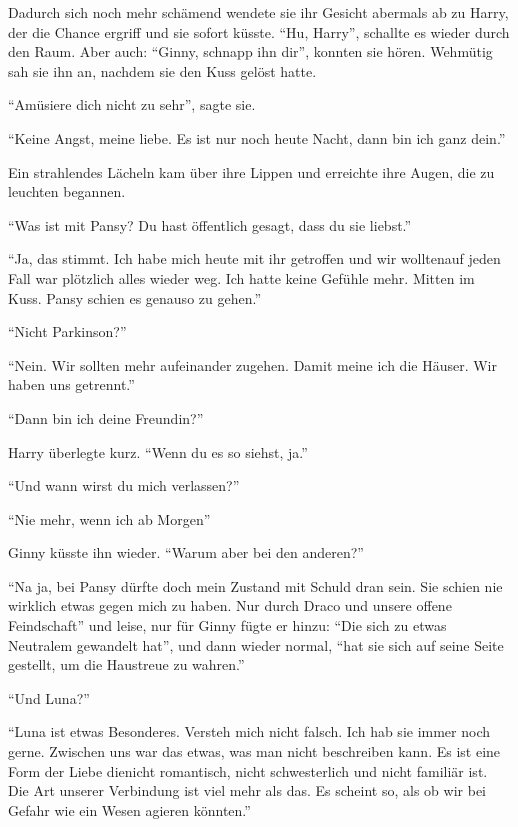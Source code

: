 Dadurch sich noch mehr schämend wendete sie ihr Gesicht abermals ab zu Harry, der die Chance ergriff und sie sofort küsste. \enquote{Hu, Harry}, schallte es wieder durch den Raum. Aber auch: \enquote{Ginny, schnapp ihn dir}, konnten sie hören. Wehmütig sah sie ihn an, nachdem sie den Kuss gelöst hatte.

\enquote{Amüsiere dich nicht zu sehr}, sagte sie.

\enquote{Keine Angst, meine liebe. Es ist nur noch heute Nacht, dann bin ich ganz dein.}

Ein strahlendes Lächeln kam über ihre Lippen und erreichte ihre Augen, die zu leuchten begannen.

\enquote{Was ist mit Pansy? Du hast öffentlich gesagt, dass du sie liebst.}

\enquote{Ja, das stimmt. Ich habe mich heute mit ihr getroffen und wir wollten\abs auf jeden Fall war plötzlich alles wieder weg. Ich hatte keine Gefühle mehr. Mitten im Kuss. Pansy schien es genauso zu gehen.}

\enquote{Nicht Parkinson?}

\enquote{Nein. Wir sollten mehr aufeinander zugehen. Damit meine ich die Häuser. Wir haben uns getrennt.}

\enquote{Dann bin ich deine Freundin?}

Harry überlegte kurz. \enquote{Wenn du es so siehst, ja.}

\enquote{Und wann wirst du mich verlassen?}

\enquote{Nie mehr, wenn ich ab Morgen\abs}

Ginny küsste ihn wieder. \enquote{Warum aber bei den anderen?}

\enquote{Na ja, bei Pansy dürfte doch mein Zustand mit Schuld dran sein. Sie schien nie wirklich etwas gegen mich zu haben. Nur durch Draco und unsere offene Feindschaft\abs} und leise, nur für Ginny fügte er hinzu: \enquote{Die sich zu etwas Neutralem gewandelt hat}, und dann wieder normal, \enquote{hat sie sich auf seine Seite gestellt, um die Haustreue zu wahren.}

\enquote{Und Luna?}

\enquote{Luna ist etwas Besonderes. Versteh mich nicht falsch. Ich hab sie immer noch gerne. Zwischen uns war das etwas, was man nicht beschreiben kann. Es ist eine Form der Liebe die\abs nicht romantisch, nicht schwesterlich und nicht familiär ist. Die Art unserer Verbindung ist viel mehr als das. Es scheint so, als ob wir bei Gefahr wie ein Wesen agieren könnten.}

